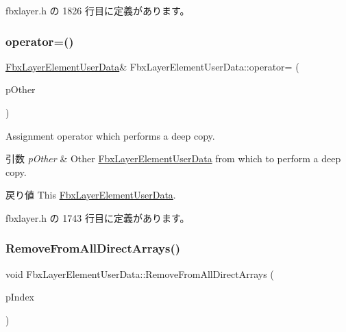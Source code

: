  fbxlayer.\+h の 1826 行目に定義があります。

\mbox{\label{class_fbx_layer_element_user_data_ae4e7b6fca22ea7dc404251bfea061e8d}} 
\subsubsection{\texorpdfstring{operator=()}{operator=()}}
{\footnotesize\ttfamily \hyperlink{class_fbx_layer_element_user_data}{Fbx\+Layer\+Element\+User\+Data}\& Fbx\+Layer\+Element\+User\+Data\+::operator= (\begin{DoxyParamCaption}\item[{\hyperlink{class_fbx_layer_element_user_data}{Fbx\+Layer\+Element\+User\+Data} const \&}]{p\+Other }\end{DoxyParamCaption})\hspace{0.3cm}{\ttfamily [inline]}}

Assignment operator which performs a deep copy. 
\begin{DoxyParams}{引数}
{\em p\+Other} & Other \hyperlink{class_fbx_layer_element_user_data}{Fbx\+Layer\+Element\+User\+Data} from which to perform a deep copy. \\
\hline
\end{DoxyParams}
\begin{DoxyReturn}{戻り値}
This \hyperlink{class_fbx_layer_element_user_data}{Fbx\+Layer\+Element\+User\+Data}. 
\end{DoxyReturn}


 fbxlayer.\+h の 1743 行目に定義があります。

\mbox{\label{class_fbx_layer_element_user_data_a2a086bdb717ea023b9bfb6cab66f23d4}} 
\subsubsection{\texorpdfstring{Remove\+From\+All\+Direct\+Arrays()}{RemoveFromAllDirectArrays()}}
{\footnotesize\ttfamily void Fbx\+Layer\+Element\+User\+Data\+::\+Remove\+From\+All\+Direct\+Arrays (\begin{DoxyParamCaption}\item[{int}]{p\+Index }\end{DoxyParamCaption})\hspace{0.3cm}{\ttfamily [inline]}}

